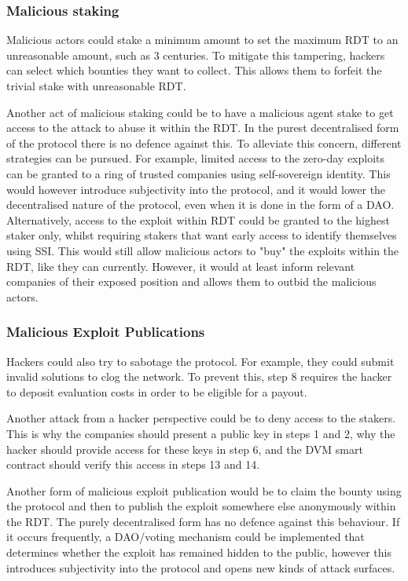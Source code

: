 \subsubsection{Malicious staking}
Malicious actors could stake a minimum amount to set the maximum RDT to an unreasonable amount, such as 3 centuries. To mitigate this tampering, hackers can select which bounties they want to collect. This allows them to forfeit the trivial stake with unreasonable RDT.

Another act of malicious staking could be to have a malicious agent stake to get access to the attack to abuse it within the RDT. In the purest decentralised form of the protocol there is no defence against this.  To alleviate this concern, different strategies can be pursued. For example, limited access to the zero-day exploits can be granted to a ring of trusted companies using self-sovereign identity. This would however introduce subjectivity into the protocol, and it would lower the decentralised nature of the protocol, even when it is done in the form of a DAO. Alternatively, access to the exploit within RDT could be granted to the highest staker only, whilst requiring stakers that want early access to identify themselves using SSI. This would still allow malicious actors to "buy" the exploits within the RDT, like they can currently. However, it would at least inform relevant companies of their exposed position and allows them to outbid the malicious actors.
\subsubsection{Malicious Exploit Publications}
Hackers could also try to sabotage the protocol. For example, they could submit invalid solutions to clog the network. To prevent this, step 8 requires the hacker to deposit evaluation costs in order to be eligible for a payout.

Another attack from a hacker perspective could be to deny access to the stakers. This is why the companies should present a public key in steps 1 and 2, why the hacker should provide access for these keys in step 6, and the DVM smart contract should verify this access in steps 13 and 14.

Another form of malicious exploit publication would be to claim the bounty using the protocol and then to publish the exploit somewhere else anonymously within the RDT. The purely decentralised form has no defence against this behaviour. If it occurs frequently, a DAO/voting mechanism could be implemented that determines whether the exploit has remained hidden to the public, however this introduces subjectivity into the protocol and opens new kinds of attack surfaces. 

